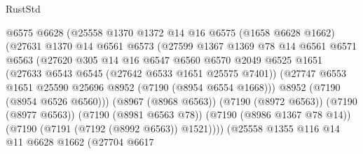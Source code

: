 \begin{lexlean}{RustStd}
\begin{coremodule}
                              @6575
                              @6628
                              (@25558
                                @1370
                                @1372
                                @14
                                @16
                                @6575
                                (@1658 @6628 @1662)
                                (@27631
                                  @1370
                                  @14
                                  @6561
                                  @6573
                                  (@27599
                                    @1367
                                    @1369
                                    @78
                                    @14
                                    @6561
                                    @6571
                                    @6563
                                    (@27620
                                      @305
                                      @14
                                      @16
                                      @6547
                                      @6560
                                      @6570
                                      @2049
                                      @6525
                                      @1651
                                      (@27633 @6543 @6545 (@27642 @6533 @1651 @25575 @7401))
                                      (@27747
                                        @6553
                                        @1651
                                        @25590
                                        @25696
                                        @8952
                                        (@7190 (@8954 @6554 @1668)))
                                      @8952
                                      (@7190 (@8954 @6526 @6560)))
                                    (@8967 (@8968 @6563))
                                    (@7190 (@8972 @6563))
                                    (@7190 (@8977 @6563))
                                    (@7190 (@8981 @6563 @78))
                                    (@7190 (@8986 @1367 @78 @14))
                                    (@7190 (@7191 (@7192 (@8992 @6563)) @1521))))
                                (@25558
                                  @1355
                                  @116
                                  @14
                                  @11
                                  @6628
                                  @1662
                                  (@27704
                                    @6617

\end{coremodule}
\end{lexlean}
